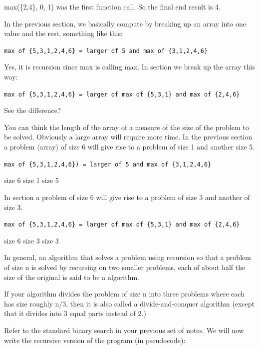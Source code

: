 max(\{2,4\}, 0, 1) was the first function call. So the final end result
is 4.






In the previous section, we basically compute by breaking up an array
into one value and the rest, something like this:

\verb!max of {5,3,1,2,4,6} = larger of 5 and max of {3,1,2,4,6}!

Yes, it is recursion since max is calling max. In 
section we break up the array this way:

\verb!max of {5,3,1,2,4,6} = larger of max of {5,3,1} and max of {2,4,6}!

See the difference?

You can think the length of the array of a measure of the size of the
problem to be solved. Obviously a large array will require more time. In
the previous section a problem (array) of size 6 will give rise to a
problem of size 1 and another size 5.

\verb!max of {5,3,1,2,4,6}) = larger of 5 and max of {3,1,2,4,6}!


size 6 \hspace{2cm} size 1 \hspace{2cm} size 5


In  section a problem of size 6 will give rise to a
problem of size 3 and another of size 3.

\verb!max of {5,3,1,2,4,6} = larger of max of {5,3,1} and max of {2,4,6}!


size 6 \hspace{2cm} size 3 \hspace{2cm} size 3


In general, an algorithm that solves a problem using recursion so that a
problem of size n is solved by recursing on two smaller problems, each
of about half the size of the original is said to be a
 algorithm.

If your algorithm divides the problem of size n into three problems
where each has size roughly n/3, then it is also called a
divide-and-conquer algorithm (except that it divides into 3 equal parts
instead of 2.)






Refer to the standard binary search in your previous set of notes. We
will now write the recursive version of the program (in pseudocode):

